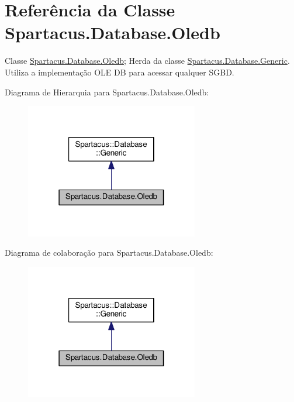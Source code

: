 \hypertarget{classSpartacus_1_1Database_1_1Oledb}{\section{Referência da Classe Spartacus.\+Database.\+Oledb}
\label{classSpartacus_1_1Database_1_1Oledb}
}


Classe \hyperlink{classSpartacus_1_1Database_1_1Oledb}{Spartacus.\+Database.\+Oledb}; Herda da classe \hyperlink{classSpartacus_1_1Database_1_1Generic}{Spartacus.\+Database.\+Generic}. Utiliza a implementação O\+L\+E D\+B para acessar qualquer S\+G\+B\+D.  




Diagrama de Hierarquia para Spartacus.\+Database.\+Oledb\+:\nopagebreak
\begin{figure}[H]
\begin{center}
\leavevmode
\includegraphics[width=214pt]{classSpartacus_1_1Database_1_1Oledb__inherit__graph}
\end{center}
\end{figure}


Diagrama de colaboração para Spartacus.\+Database.\+Oledb\+:\nopagebreak
\begin{figure}[H]
\begin{center}
\leavevmode
\includegraphics[width=214pt]{classSpartacus_1_1Database_1_1Oledb__coll__graph}
\end{center}
\end{figure}
